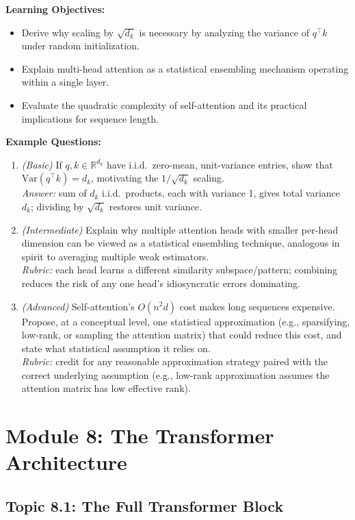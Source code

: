 \documentclass[11pt]{article}
\begin{document}
\textbf{Learning Objectives:}
\begin{itemize}
  \item Derive why scaling by $\sqrt{d_k}$ is necessary by analyzing the variance of $q^\top k$ under random initialization.
  \item Explain multi-head attention as a statistical ensembling mechanism operating within a single layer.
  \item Evaluate the quadratic complexity of self-attention and its practical implications for sequence length.
\end{itemize}

\textbf{Example Questions:}
\begin{enumerate}
  \item \textit{(Basic)} If $q, k \in \mathbb R^{d_k}$ have i.i.d.\ zero-mean, unit-variance entries, show that $\text{Var}(q^\top k) = d_k$, motivating the $1/\sqrt{d_k}$ scaling. \\
  \textit{Answer:} sum of $d_k$ i.i.d.\ products, each with variance 1, gives total variance $d_k$; dividing by $\sqrt{d_k}$ restores unit variance.
  \item \textit{(Intermediate)} Explain why multiple attention heads with smaller per-head dimension can be viewed as a statistical ensembling technique, analogous in spirit to averaging multiple weak estimators. \\
  \textit{Rubric:} each head learns a different similarity subspace/pattern; combining reduces the risk of any one head's idiosyncratic errors dominating.
  \item \textit{(Advanced)} Self-attention's $O(n^2 d)$ cost makes long sequences expensive. Propose, at a conceptual level, one statistical approximation (e.g., sparsifying, low-rank, or sampling the attention matrix) that could reduce this cost, and state what statistical assumption it relies on. \\
  \textit{Rubric:} credit for any reasonable approximation strategy paired with the correct underlying assumption (e.g., low-rank approximation assumes the attention matrix has low effective rank).
\end{enumerate}

\section{Module 8: The Transformer Architecture}

\subsection{Topic 8.1: The Full Transformer Block}
\end{document}
